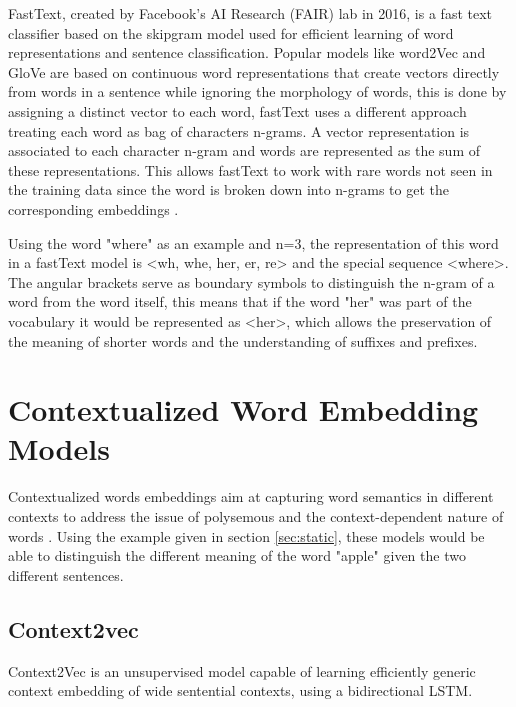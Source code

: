         \par FastText, created by Facebook's AI Research (FAIR) lab in 2016, is a fast text classifier based on the skipgram model  used for efficient learning of word representations and sentence classification. Popular models like word2Vec and GloVe  are based on continuous word representations that create vectors directly from words in a sentence while ignoring the morphology of words, this is done by assigning a distinct vector to each word, fastText uses a different approach treating each word as bag of characters n-grams. A vector representation is associated to each character n-gram and words are represented as the sum of these representations. This allows fastText to work with rare words not seen in the training data since the word is broken down into n-grams to get the corresponding embeddings \cite{bojanowski2016enriching}.


        \par Using the word "where" as an example and n=3, the representation of this word in a fastText model is <wh, whe, her, er, re> and the special sequence <where>. The angular brackets serve as boundary symbols to distinguish the n-gram of a word from the word itself, this means that if the word "her" was part of the vocabulary it would be represented as <her>, which allows the preservation of the meaning of shorter words and the understanding of suffixes and prefixes.

        

    
    \section{Contextualized Word Embedding Models}
    \label{sec:context}    
        \par Contextualized words embeddings aim at capturing word semantics in different contexts to address the issue of polysemous and the context-dependent nature of words \cite{Batista2018}. Using the example given in  section \ref{sec:static}, these models would be able to distinguish the different meaning of the word "apple" given the two different sentences.

        \subsection{Context2vec}
        
            \par Context2Vec is an unsupervised model capable of learning efficiently generic context embedding of wide sentential contexts, using a bidirectional LSTM. 

